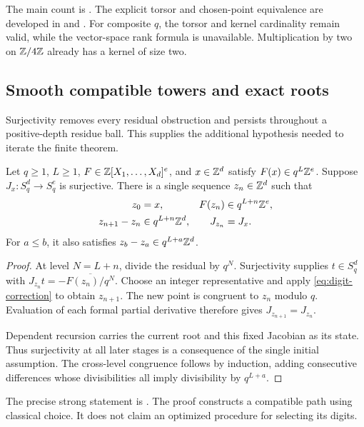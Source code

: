 The main count is
.
The explicit torsor and chosen-point equivalence are developed in
 and
.
For composite $q$, the torsor and kernel cardinality remain valid, while the
vector-space rank formula is unavailable. Multiplication by two on
$\mathbb Z/4\mathbb Z$ already has a kernel of size two.

\subsection{Smooth compatible towers and exact roots}

Surjectivity removes every residual obstruction and persists throughout a
positive-depth residue ball. This supplies the additional hypothesis needed
to iterate the finite theorem.

\begin{theorem}\label{thm:smooth-tower}
Let $q\ge1$, $L\ge1$, $F\in\mathbb Z[X_1,\ldots,X_d]^e$, and
$x\in\mathbb Z^d$ satisfy $F(x)\in q^L\mathbb Z^e$. Suppose $J_x:S_q^d\to S_q^e$
is surjective. There is a single sequence $z_n\in\mathbb Z^d$ such that
\begin{align*}
 z_0&=x,& F(z_n)&\in q^{L+n}\mathbb Z^e,\\
 z_{n+1}-z_n&\in q^{L+n}\mathbb Z^d,& J_{z_n}&=J_x.
\end{align*}
For $a\le b$, it also satisfies $z_b-z_a\in q^{L+a}\mathbb Z^d$.
\end{theorem}

\begin{proof}
At level $N=L+n$, divide the residual by $q^N$. Surjectivity supplies
$t\in S_q^d$ with $J_{z_n}t=-\overline{F(z_n)/q^N}$. Choose an integer
representative and apply \eqref{eq:digit-correction} to obtain $z_{n+1}$.
The new point is congruent to $z_n$ modulo $q$. Evaluation of each formal
partial derivative therefore gives $J_{z_{n+1}}=J_{z_n}$.

Dependent recursion carries the current root and this fixed Jacobian as
its state. Thus surjectivity at all later stages is a consequence of the
single initial assumption. The cross-level congruence follows by induction,
adding consecutive differences whose divisibilities all imply divisibility
by $q^{L+a}$.
\end{proof}

The precise strong statement is
.
The proof constructs a compatible path using classical choice. It does not
claim an optimized procedure for selecting its digits.

